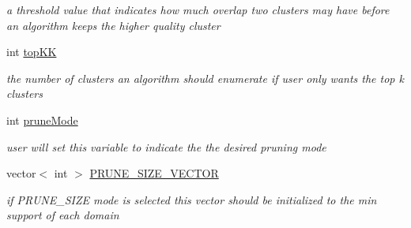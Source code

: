 \begin{DoxyCompactItemize}
\begin{DoxyCompactList}\small\item\em a threshold value that indicates how much overlap two clusters may have before an algorithm keeps the higher quality cluster \item\end{DoxyCompactList}\item 
int \hyperlink{class_lattice_algos_a90e06533d513efc4635905624283eeae}{topKK}
\begin{DoxyCompactList}\small\item\em the number of clusters an algorithm should enumerate if user only wants the top k clusters \item\end{DoxyCompactList}\item 
\hypertarget{class_lattice_algos_a5a4badfea96f02f89d8943ca7fecc2ab}{
int \hyperlink{class_lattice_algos_a5a4badfea96f02f89d8943ca7fecc2ab}{pruneMode}}
\label{class_lattice_algos_a5a4badfea96f02f89d8943ca7fecc2ab}

\begin{DoxyCompactList}\small\item\em user will set this variable to indicate the the desired pruning mode \item\end{DoxyCompactList}\item 
vector$<$ int $>$ \hyperlink{class_lattice_algos_a244d9a63307846c2df232091a78a6759}{PRUNE\_\-SIZE\_\-VECTOR}
\begin{DoxyCompactList}\small\item\em if PRUNE\_\-SIZE mode is selected this vector should be initialized to the min support of each domain \item\end{DoxyCompactList}\end{DoxyCompactItemize}
